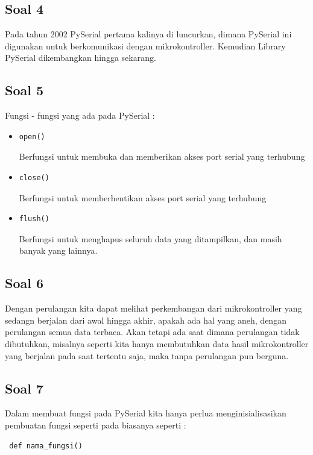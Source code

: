 	\subsection{Soal 4}
	Pada tahun 2002 PySerial pertama kalinya di luncurkan, dimana PySerial ini digunakan untuk berkomunikasi dengan mikrokontroller. Kemudian Library PySerial dikembangkan hingga sekarang.
	
	\subsection{Soal 5}
	Fungsi - fungsi yang ada pada PySerial :
		\begin{itemize}
			\item \begin{verbatim}open()\end{verbatim} 
			Berfungsi untuk membuka dan memberikan akses port serial yang terhubung
			\item \begin{verbatim}close()\end{verbatim} 
			Berfungsi untuk memberhentikan akses port serial yang terhubung
			\item \begin{verbatim}flush() \end{verbatim}
			Berfungsi untuk menghapus seluruh data yang ditampilkan, dan masih banyak yang lainnya.
			
		\end{itemize}
	
	\subsection{Soal 6}
	Dengan perulangan kita dapat melihat perkembangan dari mikrokontroller yang sedangn berjalan dari awal hingga akhir, apakah ada hal yang aneh, dengan perulangan semua data terbaca.
	Akan tetapi ada saat dimana perulangan tidak dibutuhkan, misalnya seperti kita hanya membutuhkan data hasil mikrokontroller yang berjalan pada saat tertentu saja, maka tanpa perulangan pun berguna.
	
	\subsection{Soal 7}
	Dalam membuat fungsi pada PySerial kita hanya perlua menginisialisasikan pembuatan fungsi seperti pada biasanya seperti : \begin{verbatim} def nama_fungsi() \end{verbatim}
	
